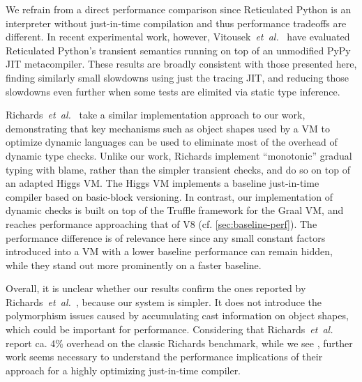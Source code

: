 %
We refrain from a direct performance comparison since
Reticulated Python is an interpreter without just-in-time compilation
and thus performance tradeoffs are different. In recent experimental
work, however, Vitousek~\textit{et~al.}~\cite{vitousek-transient-arXive-2019} have evaluated
Reticulated Python's transient semantics running on top of an
unmodified PyPy JIT metacompiler.
These results are broadly consistent with those presented here,
finding similarly small slowdowns using just the tracing JIT, and reducing
those slowdowns even further when some tests are elimited via static
type inference.


Richards~\textit{et~al.}~\cite{Richards2017} take a similar implementation
approach to our work, demonstrating that key mechanisms such as object shapes
used by a VM to optimize dynamic languages can be used to eliminate most of
the overhead of dynamic type checks.
Unlike our work, Richards
implement ``monotonic'' gradual typing with blame, rather than
the simpler transient checks, and do so on top of an adapted Higgs
VM.
The Higgs VM implements a baseline just-in-time compiler based on
basic-block versioning\citep{Chevalier-Boisvert:2016:ITS}.
In contrast, our implementation of dynamic checks
is built on top of the Truffle framework for the Graal VM, and reaches
performance approaching that of V8 (cf. \cref{sec:baseline-perf}).
The performance difference is of relevance here since any small constant factors
introduced into a VM with a lower baseline performance can remain hidden,
while they stand out more prominently on a faster baseline.

Overall, it is unclear whether our results confirm the ones
reported by Richards~\textit{et~al.}~\cite{Richards2017},
because our system is simpler.
It does not introduce the polymorphism
issues caused by accumulating cast information on object shapes,
which could be important for performance.
Considering that Richards~\textit{et~al.} report ca. 4\% overhead
on the classic Richards benchmark, while we see \OverheadRichardsP,
further work seems necessary to understand the performance implications of
their approach for a highly optimizing just-in-time compiler.

